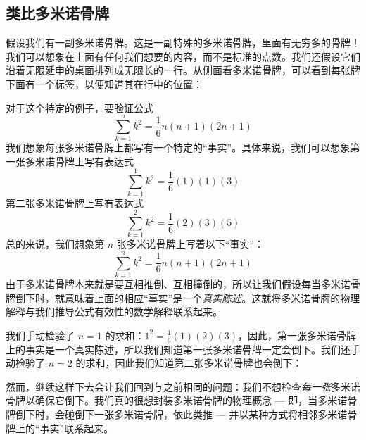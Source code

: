 \subsection{类比多米诺骨牌}

假设我们有一副多米诺骨牌。这是一副特殊的多米诺骨牌，里面有无穷多的骨牌！我们可以想象在上面有任何我们想要的内容，而不是标准的点数。我们还假设它们沿着无限延申的桌面排列成无限长的一行。从侧面看多米诺骨牌，可以看到每张牌下面有一个标签，以便知道其在行中的位置：

\begin{center}
\end{center}

对于这个特定的例子，要验证公式
\[\sum_{k=1}^{n}k^2 = \frac{1}{6}n(n+1)(2n+1)\]
我们想象每张多米诺骨牌上都写有一个特定的``事实''。具体来说，我们可以想象第一张多米诺骨牌上写有表达式
\[\sum_{k=1}^{1}k^2 = \frac{1}{6}(1)(1)(3)\]
第二张多米诺骨牌上写有表达式
\[\sum_{k=1}^{2}k^2 = \frac{1}{6}(2)(3)(5)\]
总的来说，我们想象第 $n$ 张多米诺骨牌上写着以下``事实''：
\[\sum_{k=1}^{n}k^2 = \frac{1}{6}n(n+1)(2n+1)\]
由于多米诺骨牌本来就是要互相推倒、互相撞倒的，所以让我们假设每当多米诺骨牌倒下时，就意味着上面的相应``事实''是一个\emph{真实陈述}。这就将多米诺骨牌的物理解释与我们推导公式有效性的数学解释联系起来。

我们手动检验了 $n = 1$ 的求和：$1^2=\frac{1}{6}(1)(2)(3)$，因此，第一张多米诺骨牌上的事实是一个真实陈述，所以我们知道第一张多米诺骨牌一定会倒下。我们还手动检验了 $n = 2$ 的求和，因此我们知道第二张多米诺骨牌也会倒下：

\begin{center}
\end{center}
然而，继续这样下去会让我们回到与之前相同的问题：我们不想检查\emph{每一张}多米诺骨牌以确保它倒下。我们真的很想封装多米诺骨牌的物理概念 --- 即，当多米诺骨牌倒下时，会碰倒下一张多米诺骨牌，依此类推 --- 并以某种方式将相邻多米诺骨牌上的``事实''联系起来。

